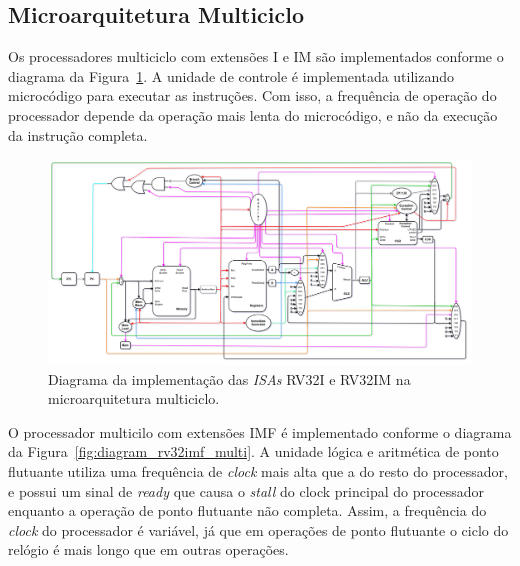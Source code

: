     \subsection{Microarquitetura Multiciclo}
        { Os processadores multiciclo com extensões I e IM são implementados
            conforme o diagrama da Figura~\ref{fig:diagram_rv32i_multi}. A
            unidade de controle é implementada utilizando microcódigo para
            executar as instruções. Com isso, a frequência de operação do
            processador depende da operação mais lenta do microcódigo, e não da
            execução da instrução completa.
        }

        \begin{figure}[H]
        \centering
            \includegraphics[width=1\linewidth]{../images/uarch_diagrams/multicycle-RV32I-RV32IM.png}
            \caption{Diagrama da implementação das \textit{ISAs} RV32I e RV32IM na
            microarquitetura multiciclo.}\label{fig:diagram_rv32i_multi}
        \end{figure}

        { O processador multicilo com extensões IMF é implementado conforme o
            diagrama da Figura~\ref{fig:diagram_rv32imf_multi}. A unidade lógica
            e aritmética de ponto flutuante utiliza uma frequência de \textit{clock}
            mais alta que a do resto do processador, e possui um sinal de
            \textit{ready} que causa o \textit{stall} do clock principal do
            processador enquanto a operação de ponto flutuante não completa.
            Assim, a frequência do \textit{clock} do processador é variável, já
            que em operações de ponto flutuante o ciclo do relógio é mais longo
            que em outras operações.
        }

